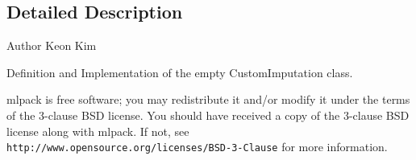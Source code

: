 \subsection{Detailed Description}
\begin{DoxyAuthor}{Author}
Keon Kim
\end{DoxyAuthor}
Definition and Implementation of the empty Custom\+Imputation class.

mlpack is free software; you may redistribute it and/or modify it under the terms of the 3-\/clause B\+SD license. You should have received a copy of the 3-\/clause B\+SD license along with mlpack. If not, see {\tt http\+://www.\+opensource.\+org/licenses/\+B\+S\+D-\/3-\/\+Clause} for more information. 